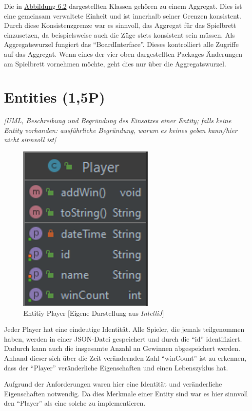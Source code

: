 \noindent Die in \hyperref[fig:aggregat]{Abbildung 6.2} dargestellten Klassen gehören zu einem Aggregat. Dies ist eine gemeinsam verwaltete Einheit und ist innerhalb seiner Grenzen konsistent. Durch diese Konsistenzgrenze war es sinnvoll, das Aggregat für das Spielbrett einzusetzen, da beispielsweise auch die Züge stets konsistent sein müssen. Als Aggregatswurzel fungiert das \enquote{BoardInterface}. Dieses kontrolliert alle Zugriffe auf das Aggregat. Wenn eines der vier oben dargestellten Packages Änderungen am Spielbrett vornehmen möchte, geht dies nur über die Aggregatswurzel. 

\section{Entities (1,5P)}
\emph{[UML, Beschreibung und Begründung des Einsatzes einer Entity; falls keine Entity vorhanden:
ausführliche Begründung, warum es keines geben kann/hier nicht sinnvoll ist]}

\begin{figure}[htbp]
\centering
\centerline{\includegraphics[scale=.6]{entities}}
\caption{Entitiy Player [Eigene Darstellung aus \emph{IntelliJ}]}
\label{fig:entities}
\end{figure}

\noindent Jeder Player hat eine eindeutige Identität. Alle Spieler, die jemals teilgenommen haben, werden in einer JSON-Datei gespeichert und durch die \enquote{id} identifiziert. Dadurch kann auch die insgesamte Anzahl an Gewinnen abgespeichert werden. Anhand dieser sich über die Zeit verändernden Zahl \enquote{winCount} ist zu erkennen, dass der \enquote{Player} veränderliche Eigenschaften und einen Lebenszyklus hat. 

Aufgrund der Anforderungen waren hier eine Identität und veränderliche Eigenschaften notwendig. Da dies Merkmale einer Entity sind war es hier sinnvoll den \enquote{Player} als eine solche zu implementieren.

